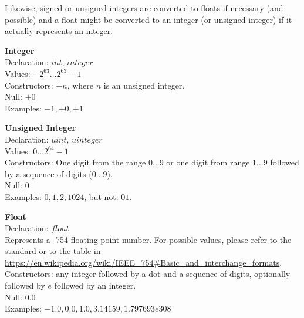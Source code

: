 Likewise, signed or unsigned integers are converted to floats
if necessary (and possible) and a float might be converted
to an integer (or unsigned integer) if it actually
represents an integer.

\begin{minipage}{\textwidth}
\textbf{Integer}\\
Declaration: $int$, $integer$ \\
Values: $-2^{63} \dots 2^{63}-1$ \\
Constructors: $\pm n$, where $n$ is an unsigned integer.\\
Null: $+0$ \\
Examples: $-1, +0, +1$
\end{minipage}

\begin{minipage}{\textwidth}
\textbf{Unsigned Integer} \\
Declaration: $uint$, $uinteger$ \\
Values: $0 \dots 2^{64}-1$  \\
Constructors: One digit from the range $0\dots 9$
or one digit from range $1\dots 9$ followed by
a sequence of digits ($0\dots9$). \\
Null: $0$ \\
Examples: $0, 1, 2, 1024$, but not: $01$.
\end{minipage}

\begin{minipage}{\textwidth}
\textbf{Float} \\
Declaration: $float$ \\
Represents a  -754 floating point number.
For possible values, please refer to the standard or to the table in
\url{https://en.wikipedia.org/wiki/IEEE\_754#Basic\_and\_interchange\_formats}.\\
Constructors: any integer followed by a dot and a sequence of digits,
              optionally followed by $e$ followed by an integer.
               \\
Null: $0.0$ \\
Examples: $-1.0, 0.0, 1.0, 3.14159, 1.797693e308$ 
\end{minipage}

